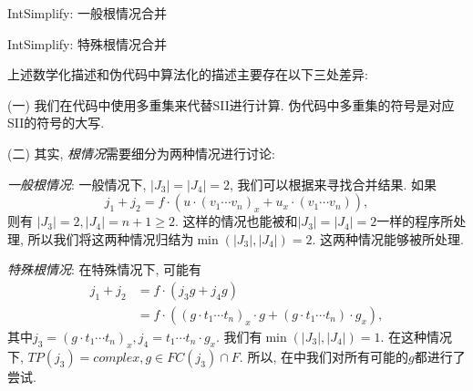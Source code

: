 \begin{algorithm}
\caption{IntSimplify: 一般根情况合并} 
\label{FindRuleForVars2}
\end{algorithm}

\begin{algorithm}
\caption{IntSimplify: 特殊根情况合并}
\label{FindRuleForVars1}
\end{algorithm}

上述数学化描述和伪代码中算法化的描述主要存在以下三处差异:

(一) 我们在代码中使用多重集来代替SII进行计算. 伪代码中多重集的符号是对应SII的符号的大写.

(二) 其实, \emph{根情况}需要细分为两种情况进行讨论:
\begin{asparaenum}[(i)]
\item \emph{一般根情况}: 一般情况下, $|J_3|=|J_4|=2$, 我们可以根据来寻找合并结果. 如果 
\begin{equation}
j_1+j_2 = f \cdot ( u \cdot (v_1 \cdots v_n)_x +  u_x \cdot (v_1 \cdots v_n ) ), 
\end{equation}
则有 $|J_3|=2,|J_4|=n+1\ge 2$. 这样的情况也能被和$|J_3|=|J_4|=2$一样的程序所处理, 所以我们将这两种情况归结为$\min(|J_3|,|J_4|)=2$. 这两种情况能够被所处理.
\item \emph{特殊根情况}: 在特殊情况下, 可能有
\begin{equation}
\begin{split}
j_1 + j_2   &= f \cdot ( j_3 g + j_4 g ) \\ 
            &= f \cdot ( (g \cdot t_1\cdots t_n)_x\cdot g + (g \cdot t_1\cdots t_n)\cdot g_x ),
\end{split}
\end{equation}
其中$j_3=(g \cdot t_1\cdots t_n)_x , j_4=t_1\cdots t_n\cdot g_x$. 我们有$\min(|J_3|,|J_4|)=1$. 在这种情况下, $TP(j_3)=complex, g\in FC(j_3)\cap F$. 所以, 在中我们对所有可能的$g$都进行了尝试. 
\end{asparaenum}

